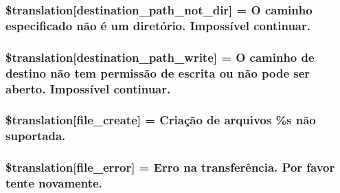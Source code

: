 \subsubsection[{\$translation}]{\setlength{\rightskip}{0pt plus 5cm}\$translation\mbox{[}\textquotesingle{}destination\+\_\+path\+\_\+not\+\_\+dir\textquotesingle{}\mbox{]} = \textquotesingle{}O caminho especificado não é um diretório. Impossível continuar.\textquotesingle{}}\label{class_8upload_8pt___b_r_8php_a5704a67137126e8c87b7a364175929d4}
\hypertarget{class_8upload_8pt___b_r_8php_a40e4e1962226b89fd76da5819a9602b0}{}
\subsubsection[{\$translation}]{\setlength{\rightskip}{0pt plus 5cm}\$translation\mbox{[}\textquotesingle{}destination\+\_\+path\+\_\+write\textquotesingle{}\mbox{]} = \textquotesingle{}O caminho de destino não tem permissão de escrita ou não pode ser aberto. Impossível continuar.\textquotesingle{}}\label{class_8upload_8pt___b_r_8php_a40e4e1962226b89fd76da5819a9602b0}
\hypertarget{class_8upload_8pt___b_r_8php_a1ecb4673e4fb69e06b3f20b65cecf30a}{}
\subsubsection[{\$translation}]{\setlength{\rightskip}{0pt plus 5cm}\$translation\mbox{[}\textquotesingle{}file\+\_\+create\textquotesingle{}\mbox{]} = \textquotesingle{}Criação de arquivos \%s não suportada.\textquotesingle{}}\label{class_8upload_8pt___b_r_8php_a1ecb4673e4fb69e06b3f20b65cecf30a}
\hypertarget{class_8upload_8pt___b_r_8php_ac7498e49b9771b04698029aa61c70821}{}
\subsubsection[{\$translation}]{\setlength{\rightskip}{0pt plus 5cm}\$translation\mbox{[}\textquotesingle{}file\+\_\+error\textquotesingle{}\mbox{]} = \textquotesingle{}Erro na transferência. Por favor tente novamente.\textquotesingle{}}\label{class_8upload_8pt___b_r_8php_ac7498e49b9771b04698029aa61c70821}
\hypertarget{class_8upload_8pt___b_r_8php_a4ce76e7be0b3a03c2b47f6d70c21832e}{}
